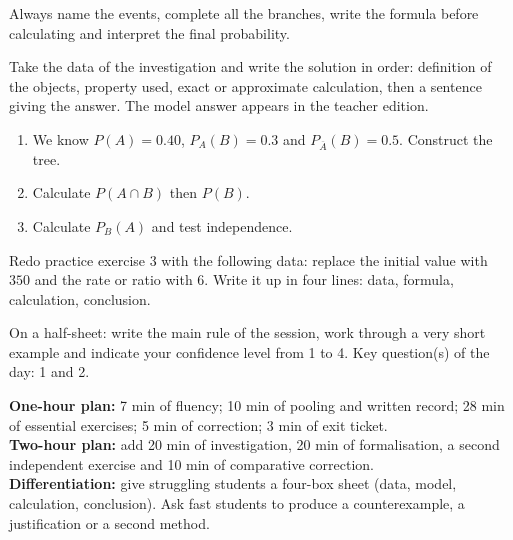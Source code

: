 \begin{traceecrite}Always name the events, complete all the branches, write the formula before calculating and interpret the final probability.\end{traceecrite}

\begin{exemple}
Take the data of the investigation and write the solution in order: definition of the objects, property used, exact or approximate calculation, then a sentence giving the answer. The model answer appears in the teacher edition.
\end{exemple}

\begin{exercice}[-- essential]
\begin{enumerate}\item We know $P(A)=0.40$, $P_A(B)=0.3$ and $P_{\overline A}(B)=0.5$. Construct the tree.\item Calculate $P(A\cap B)$ then $P(B)$.\item Calculate $P_B(A)$ and test independence.\end{enumerate}
\end{exercice}


\begin{dm}Redo practice exercise 3 with the following data: replace the initial value with $350$ and the rate or ratio with $6$. Write it up in four lines: data, formula, calculation, conclusion.\end{dm}

\begin{sortie}On a half-sheet: write the main rule of the session, work through a very short example and indicate your confidence level from 1 to 4. Key question(s) of the day: 1 and 2.\end{sortie}

\ifprof
\begin{methode}
\textbf{One-hour plan:} 7 min of fluency; 10 min of pooling and written record; 28 min of essential exercises; 5 min of correction; 3 min of exit ticket.\\
\textbf{Two-hour plan:} add 20 min of investigation, 20 min of formalisation, a second independent exercise and 10 min of comparative correction.\\
\textbf{Differentiation:} give struggling students a four-box sheet (data, model, calculation, conclusion). Ask fast students to produce a counterexample, a justification or a second method.
\end{methode}
\fi
